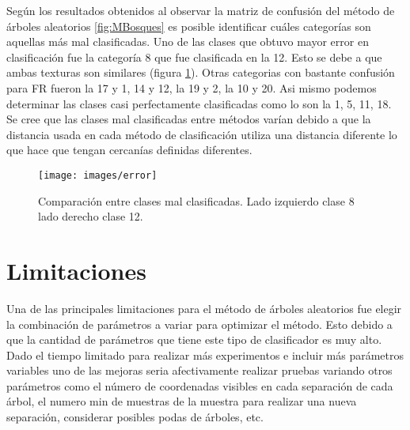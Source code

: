 \documentclass[10pt,twocolumn,letterpaper]{article}
\begin{document}
Según los resultados obtenidos al observar la matriz de confusión del método de árboles aleatorios \ref{fig:MBosques} es posible identificar cuáles categorías son aquellas más mal clasificadas. Uno de las clases que obtuvo mayor error en clasificación fue la categoría 8 que fue clasificada en la 12. Esto se debe a que ambas texturas son similares (figura \ref{fig:error}).%
Otras categorias con bastante confusión para FR fueron la 17 y 1, 14 y 12, la 19 y 2, la 10 y 20. Asi mismo podemos determinar las clases casi perfectamente clasificadas como lo son la 1, 5, 11, 18. \\

Se cree que las clases mal clasificadas entre métodos varían debido a que la distancia usada en cada método de clasificación utiliza una distancia diferente lo que hace que tengan cercanías definidas diferentes.


\begin{figure}[t]
\begin{center}
   \texttt{[image: images/error]}
\end{center}
   \caption{Comparación entre clases mal clasificadas. Lado izquierdo clase 8 lado derecho clase 12.}
\label{fig:error}
\end{figure}

\section{Limitaciones}



Una de las principales limitaciones para el método de árboles aleatorios fue elegir la combinación de parámetros a variar para optimizar el método. Esto debido a que la cantidad de parámetros que tiene este tipo de clasificador es muy alto. Dado el tiempo limitado para realizar más experimentos e incluir más parámetros variables uno de las mejoras seria afectivamente realizar pruebas variando otros parámetros como el número de coordenadas visibles en cada separación de cada árbol, el numero min de muestras de la muestra para realizar una nueva separación, considerar posibles podas de árboles, etc.\\
\end{document}
